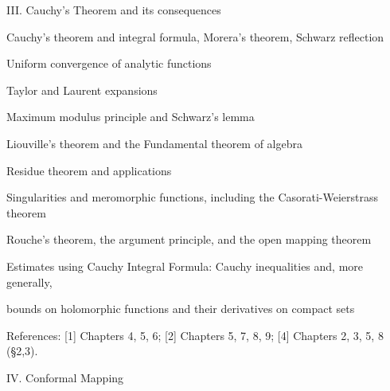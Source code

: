 \documentclass[a4paper,portrait,12pt]{article}
\begin{document}
\begin{flushleft}
III. Cauchy's Theorem and its consequences
\end{flushleft}


\begin{flushleft}
Cauchy's theorem and integral formula, Morera's theorem, Schwarz reflection
\end{flushleft}


\begin{flushleft}
Uniform convergence of analytic functions
\end{flushleft}


\begin{flushleft}
Taylor and Laurent expansions
\end{flushleft}


\begin{flushleft}
Maximum modulus principle and Schwarz's lemma
\end{flushleft}


\begin{flushleft}
Liouville's theorem and the Fundamental theorem of algebra
\end{flushleft}


\begin{flushleft}
Residue theorem and applications
\end{flushleft}


\begin{flushleft}
Singularities and meromorphic functions, including the Casorati-Weierstrass theorem
\end{flushleft}


\begin{flushleft}
Rouche's theorem, the argument principle, and the open mapping theorem
\end{flushleft}


\begin{flushleft}
Estimates using Cauchy Integral Formula: Cauchy inequalities and, more generally,
\end{flushleft}


\begin{flushleft}
bounds on holomorphic functions and their derivatives on compact sets
\end{flushleft}


\begin{flushleft}
References: [1] Chapters 4, 5, 6; [2] Chapters 5, 7, 8, 9; [4] Chapters 2, 3, 5, 8 (§2,3).
\end{flushleft}


\begin{flushleft}
IV. Conformal Mapping
\end{flushleft}
\end{document}
